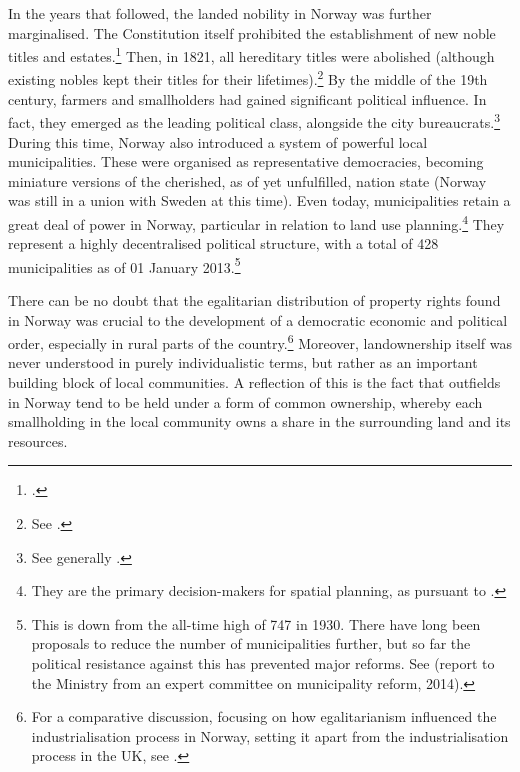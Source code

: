 In the years that followed, the landed nobility in Norway was further marginalised. The Constitution itself prohibited the establishment of new noble titles and estates.\dni\footcite[23|118]{grunnloven14} Then, in 1821, all hereditary titles were abolished (although existing nobles kept their titles for their lifetimes).\footnote{See \cite{adel09}.} By the middle of the 19th century, farmers and smallholders had gained significant political influence. In fact, they emerged as the leading political class, alongside the city bureaucrats.\footnote{See generally \cite{hommerstad14}.} During this time, Norway also introduced a system of powerful local municipalities. These were organised as representative democracies, becoming miniature versions of the cherished, as of yet unfulfilled, nation state (Norway was still in a union with Sweden at this time). Even today, municipalities retain a great deal of power in Norway, particular in relation to land use planning.\footnote{They are the primary decision-makers for spatial planning, as pursuant to \cite{pb08}.} They represent a highly decentralised political structure, with a total of 428 municipalities as of 01 January 2013.\footnote{This is down from the all-time high of 747 in 1930. There have long been proposals to reduce the number of municipalities further, but so far the political resistance against this has prevented major reforms. See \cite{kommuner14} (report to the Ministry from an expert committee on municipality reform, 2014).} %

There can be no doubt that the egalitarian distribution of property rights found in Norway was crucial to the development of a democratic economic and political order, especially in rural parts of the country.\footnote{For a comparative discussion, focusing on how egalitarianism influenced the industrialisation process in Norway, setting it apart from the industrialisation process in the UK, see \cite{brox13}.} Moreover, landownership itself was never understood in purely individualistic terms, but rather as an important building block of local communities. A reflection of this is the fact that outfields in Norway tend to be held under a form of common ownership, whereby each smallholding in the local community owns a share in the surrounding land and its resources.


